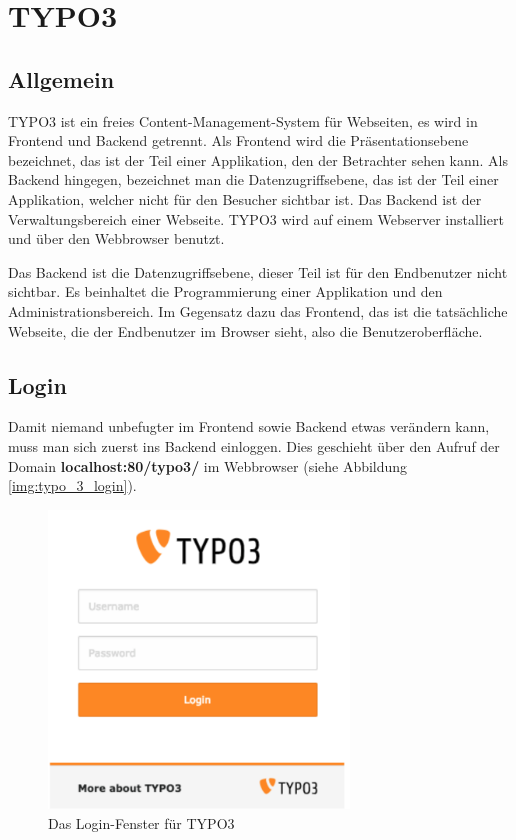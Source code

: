 \section{TYPO3}
\subsection{Allgemein}

TYPO3 ist ein freies Content-Management-System für Webseiten, es wird in Frontend und Backend getrennt. Als Frontend wird die Präsentationsebene bezeichnet, das ist der Teil einer Applikation, den der Betrachter sehen kann. Als Backend hingegen, bezeichnet man die Datenzugriffsebene, das ist der Teil einer Applikation, welcher nicht für den Besucher sichtbar ist. Das Backend ist der Verwaltungsbereich einer Webseite. TYPO3 wird auf einem Webserver installiert und über den Webbrowser benutzt.

Das Backend ist die Datenzugriffsebene, dieser Teil ist für den Endbenutzer nicht sichtbar. Es beinhaltet die Programmierung einer Applikation und den Administrationsbereich. Im Gegensatz dazu das Frontend, das ist die tatsächliche Webseite, die der Endbenutzer im Browser sieht, also die Benutzeroberfläche.

\subsection{Login}

Damit niemand unbefugter im Frontend sowie Backend etwas verändern kann, muss man sich zuerst ins Backend einloggen. Dies geschieht über den Aufruf der Domain \textbf{localhost:80/typo3/} im Webbrowser (siehe Abbildung \ref{img:typo_3_login}).

\begin{figure}[ht!]
\centering
\includegraphics[width=8cm]{Figures/paula/typo3/login_TYPO3.png}
\caption{Das Login-Fenster für TYPO3}
\label{img:typo_3_logIn}
\end{figure}

